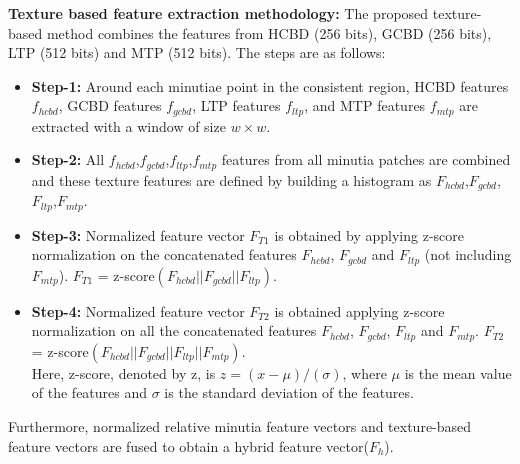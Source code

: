 \noindent \textbf{Texture based feature extraction methodology:} The proposed
texture-based method combines the features from HCBD (256 bits), GCBD (256
bits), LTP (512 bits) and MTP (512 bits). The steps are as follows:
\begin{itemize}
	\item \textbf{ Step-1:} Around each minutiae point in the consistent region,
	      HCBD features $f_{hcbd}$, GCBD features $f_{gcbd}$, LTP features
	      $f_{ltp}$, and MTP features $f_{mtp}$ are extracted with a window of
	      size $w \times w$.
	\item \textbf{ Step-2:} All $f_{hcbd}$,$f_{gcbd}$,$f_{ltp}$,$f_{mtp}$
	      features from all minutia patches are combined and these texture
	      features are defined by building a histogram as $F_{hcbd}$,$F_{gcbd}$,$F_{ltp}$,$F_{mtp}$.
	\item \textbf{ Step-3:} Normalized feature vector $F_{T1}$ is obtained by
	      applying z-score normalization on the concatenated features $F_{hcbd}$,
	      $F_{gcbd}$ and $F_{ltp}$ (not including $F_{mtp}$).
	      \subitem  $F_{T1}$ = z-score$(F_{hcbd}||
		      F_{gcbd} ||F_{ltp})$.
	\item \textbf{ Step-4:} Normalized feature vector $F_{T2}$ is obtained
	      applying z-score normalization on all the concatenated features $F_{hcbd}$,
	      $F_{gcbd}$, $F_{ltp}$ and $F_{mtp} $.
	      \subitem  $F_{T2}$ = z-score$(F_{hcbd}|| F_{gcbd} ||F_{ltp}||F_{mtp})$.\\
	      Here, z-score, denoted by z, is $z = (x - \mu) / (\sigma)$,
	      where $\mu$ is the mean value of the features and $\sigma$ is the
	      standard deviation of the features.
\end{itemize}
Furthermore, normalized relative minutia feature vectors and texture-based
feature vectors are fused to obtain a hybrid feature vector($F_{h}$).



